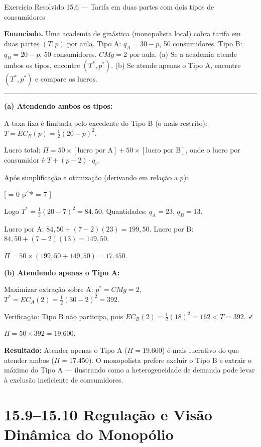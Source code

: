 \documentclass[11pt,twoside,openright]{book}
\begin{document}
\begin{exresolvidobox}{Exercício Resolvido 15.6 — Tarifa em duas partes com dois tipos de consumidores}

\textbf{Enunciado.} Uma academia de ginástica (monopolista local) cobra
tarifa em duas partes \((T, p)\) por aula. Tipo A: \(q_A = 30 - p\), 50
consumidores. Tipo B: \(q_B = 20 - p\), 50 consumidores. \(CMg = 2\) por
aula. (a) Se a academia atende ambos os tipos, encontre \((T^*, p^*)\).
(b) Se atende apenas o Tipo A, encontre \((T^*, p^*)\) e compare os
lucros.

\begin{center}\rule{0.5\linewidth}{0.5pt}\end{center}

\textbf{(a) Atendendo ambos os tipos:}

A taxa fixa é limitada pelo excedente do Tipo B (o mais restrito):
\(T = EC_B(p) = \frac{1}{2}(20-p)^2\).

Lucro total:
\(\Pi = 50 \times [\text{lucro por A}] + 50 \times [\text{lucro por B}]\),
onde o lucro por consumidor é \(T + (p-2) \cdot q_i\).

Após simplificação e otimização (derivando em relação a \(p\)):

{[}  = 0 \implies p\^{}* = 7 {]}

Logo \(T^* = \frac{1}{2}(20-7)^2 = 84{,}50\). Quantidades: \(q_A = 23\),
\(q_B = 13\).

Lucro por A: \(84{,}50 + (7-2)(23) = 199{,}50\). Lucro por B:
\(84{,}50 + (7-2)(13) = 149{,}50\).

\(\Pi = 50 \times (199{,}50 + 149{,}50) = 17.450\).

\textbf{(b) Atendendo apenas o Tipo A:}

Maximizar extração sobre A: \(p^* = CMg = 2\),
\(T^* = EC_A(2) = \frac{1}{2}(30-2)^2 = 392\).

Verificação: Tipo B não participa, pois
\(EC_B(2) = \frac{1}{2}(18)^2 = 162 < T = 392\). ✓

\(\Pi = 50 \times 392 = 19.600\).

\textbf{Resultado:} Atender apenas o Tipo A (\(\Pi = 19.600\)) é mais
lucrativo do que atender ambos (\(\Pi = 17.450\)). O monopolista prefere
excluir o Tipo B e extrair o máximo do Tipo A --- ilustrando como a
heterogeneidade de demanda pode levar à exclusão ineficiente de
consumidores.

\end{exresolvidobox}

\chapter{15.9--15.10 Regulação e Visão Dinâmica do
Monopólio}\label{regulauxe7uxe3o-e-visuxe3o-dinuxe2mica-do-monopuxf3lio}
\end{document}
